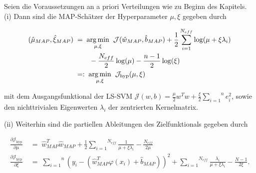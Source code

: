 \begin{theorem}

Seien die Voraussetzungen an a priori Verteilungen wie zu Beginn des Kapitels.\\
(i) Dann sind die MAP-Schätzer der Hyperparameter $\mu, \xi$ gegeben durch

\begin{align*}
	(\hat{\mu}_{MAP}, \hat{\xi}_{MAP}) &\;=\; \underset{\mu, \xi}{\arg \min}  \hspace{0.2cm}		\mathcal{J}(\hat{w}_{MAP}, \hat{b}_{MAP}) + \frac{1}{2}\sum_{i=1}^{N_{eff}}\log(\mu 		+ \xi \lambda_i) \\
	 & \hspace{0.8cm}- \frac{N_{eff}}{2}\log(\mu) - \frac{n -1 }{2}\log(\xi)\\
	&\;=:\; \underset{\mu, \xi}{\arg \min} \hspace{0.2cm}	\mathcal{J}_\text{hyp}(\mu, \xi)
\end{align*}



mit dem Ausgangsfunktional der LS-SVM 
$\mathcal{J}(w,b) = \frac{\mu}{2}w^T w + \frac{\xi}{2}\overset{n}{\underset{i=1}{\sum}} e_i ^2$,
sowie den nichttrivialen Eigenwerten $\lambda_i$ der zentrierten Kernelmatrix.

(ii) Weiterhin sind die partiellen Ableitungen des Zielfunktionals gegeben durch

\begin{align*}
	\frac{\partial \mathcal{J}_\text{hyp}}{\partial \mu} &\;=\; \hat{w}_{MAP}^T \hat{w}			_{MAP} + \frac{1}{2} \overset{N_{eff}}{\underset{i=1}{\sum}} \frac{1}{\mu + \xi 			\lambda_i} - \frac{N_{eff}}{2\mu} \\
    \frac{\partial \mathcal{J}_\text{hyp}}{\partial \xi} &\;=\; \overset{n}						{\underset{i=1}{\sum}}( y_i - (\hat{w}_{MAP}^T \varphi(x_i) + \hat{b}_{MAP}))^2 + \overset{N_{eff}}{\underset{i=1}{\sum}} \frac{\lambda_i}{\mu + \xi \lambda_i} - \frac{N-1}{2\xi}.
\end{align*} 
\end{theorem}

